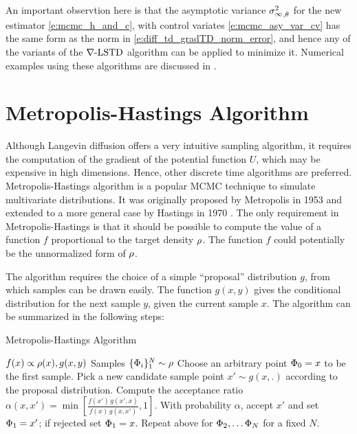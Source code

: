 An important observtion here is that the asymptotic variance ${\sigma^2_\infty}_{,\theta}$ for the new estimator \eqref{e:mcmc_h_and_c}, with control variates \eqref{e:mcmc_asy_var_cv} has the same form as the norm in \eqref{e:diff_td_gradTD_norm_error}, and hence any of the variants of the $\nabla\text{-LSTD}$ algorithm can be applied to minimize it. Numerical examples using these algorithms are discussed in .

\section{Metropolis-Hastings Algorithm}
\label{s:mcmc_metropolis}
Although Langevin diffusion offers a very intuitive sampling algorithm, it requires the computation of the gradient of the potential function $U$, which may be expensive in high dimensions. Hence, other discrete time algorithms are preferred. Metropolis-Hastings algorithm is a popular MCMC technique to simulate multivariate distributions. It was originally proposed by Metropolis in 1953 and extended to a more general case by Hastings in 1970 \cite{has70}. The only requirement in Metropolis-Hastings is that it should be possible to compute the value of a function $f$ proportional to the target density $\rho$. The function $f$ could potentially be the unnormalized form of $\rho$.

The algorithm requires the choice of a simple ``proposal'' distribution $g$, from which samples can be drawn easily. The function $g(x,y)$ gives the conditional distribution for the next sample $y$, given the current sample $x$.  The algorithm can be summarized in the following steps:

\begin{algorithm}{Metropolis-Hastings Algorithm}
	\begin{algorithmic}[1]
	\Require $f(x) \propto \rho(x), g(x,y)$
	\Ensure Samples $\{\Phi_i\}_1^N \sim \rho$
	\State Choose an arbitrary point $\Phi_0 = x$ to be the first sample.
	\State Pick a new candidate sample point $x' \sim g (x,.) $ according to the proposal distribution.
	\State Compute the acceptance ratio $\alpha(x,x')= \min \left[ \frac{f(x') \, g (x',x)}{f(x) \, g(x,x')}, 1\right] $.
	\State With probability $\alpha$, accept $x'$ and set $\Phi_1 = x'$; if rejected set $\Phi_1 = x$.
	\State Repeat above for $ \Phi_2, \hdots \Phi_N$ for a fixed $N$.
	\end{algorithmic}
\end{algorithm}

